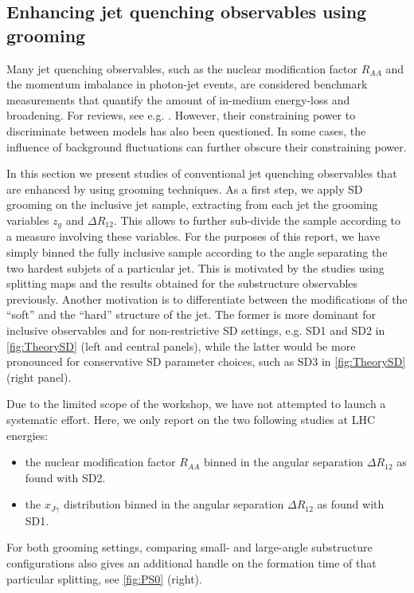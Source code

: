 \subsection{Enhancing jet quenching observables using grooming}
\label{sec:dissecting}

Many jet quenching observables, such as the nuclear modification factor $R_{AA}$ and the momentum imbalance in photon-jet events, are considered benchmark measurements that quantify the amount of in-medium energy-loss and broadening. For reviews, see e.g. \cite{dEnterria:2009xfs,Majumder:2010qh}. However, their constraining power to discriminate between models has also been questioned. In some cases, the influence of background fluctuations can further obscure their constraining power.

In this section we present studies of conventional jet quenching observables that are enhanced by using grooming techniques.  As a first step, we apply SD grooming on the inclusive jet sample, extracting from each jet the grooming variables $z_g$ and $\Delta R_{12}$. 
This allows to further sub-divide the sample according to a measure involving these variables. 
For the purposes of this report, we have simply binned the fully inclusive sample according to the angle separating the two hardest subjets of a particular jet. This is motivated by the studies using splitting maps and the results obtained for the substructure observables previously. Another motivation is to differentiate between the modifications of the ``soft'' and the ``hard'' structure of the jet. The former is more dominant for inclusive observables and for non-restrictive SD settings, e.g. SD1 and SD2 in \autoref{fig:TheorySD} (left and central panels), while the latter would be more pronounced for conservative SD parameter choices, such as SD3 in \autoref{fig:TheorySD} (right panel).

Due to the limited scope of the workshop, we have not attempted to launch a systematic effort. Here, we only report on the two following studies at LHC energies:
\begin{itemize} 

\item the nuclear modification factor $R_{AA}$ binned in the angular separation $\Delta R_{12}$ as found with SD2.

\item the $x_{J\gamma}$ distribution binned in the angular separation $\Delta R_{12}$ as found with SD1. 
\end{itemize}
For both grooming settings, comparing small- and large-angle substructure configurations also gives an additional handle on the formation time of that particular splitting, see \autoref{fig:PS0} (right).

